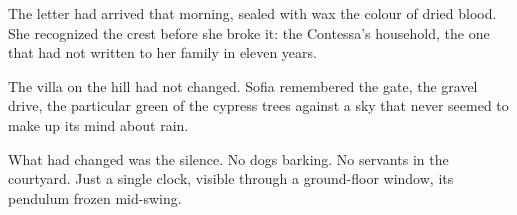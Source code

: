 \documentclass{novel}
\begin{document}
\scenebreak

The letter had arrived that morning, sealed with wax the colour of
dried blood. She recognized the crest before she broke it: the
Contessa's household, the one that had not written to her family in
eleven years.

\clearpage

\begin{ChapterStart}
\vspace*{2\nbs}
\end{ChapterStart}
The villa on the hill had not changed. Sofia remembered the gate, the
gravel drive, the particular green of the cypress trees against a sky
that never seemed to make up its mind about rain.

What had changed was the silence. No dogs barking. No servants in the
courtyard. Just a single clock, visible through a ground-floor window,
its pendulum frozen mid-swing.

\clearpage
\end{document}
